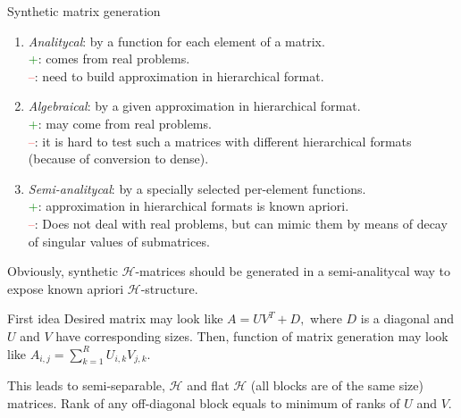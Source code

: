 \documentclass{beamer}
\begin{document}
\begin{frame}{Synthetic matrix generation}
\begin{enumerate}
\item \textit{Analitycal}: by a function for each element of a matrix.\\
\textcolor{green}{+}: comes from real problems.\\ \textcolor{red}{--}: need to
build approximation in hierarchical format.
\item \textit{Algebraical}: by a given approximation in hierarchical
format.\\ \textcolor{green}{+}: may come from real problems.\\
\textcolor{red}{--}: it is hard to test such a matrices with different
hierarchical formats (because of conversion to dense).
\item \textit{Semi-analitycal}: by a specially selected per-element
functions.\\ \textcolor{green}{+}: approximation in hierarchical formats is
known apriori.\\ \textcolor{red}{--}: Does not deal with real problems, but can
mimic them by means of decay of singular values of submatrices.
\end{enumerate}
\begin{alertblock}{}
Obviously, synthetic $\mathcal{H}$-matrices should be generated in a
semi-analitycal way to expose known apriori $\mathcal{H}$-structure.
\end{alertblock}
\end{frame}

\begin{frame}{First idea}
Desired matrix may look like $A = UV^T+D,$ where $D$ is a diagonal and $U$ and
$V$ have corresponding sizes. Then, function of matrix generation may look like
$A_{i,j} = \sum_{k=1}^{R} U_{i,k}V_{j,k}$.
\begin{center}
\end{center}
\begin{alertblock}{This leads to}
semi-separable, $\mathcal{H}$ and flat $\mathcal{H}$ (all blocks are of the
same size) matrices. Rank of any off-diagonal block equals to minimum of ranks
of $U$ and $V$.
\end{alertblock}
\end{frame}
\end{document}

